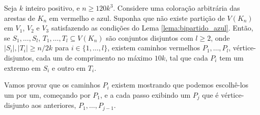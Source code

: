 \begin{fato}
	\label{fato:caminhos_vermelhos}
	Seja $k$ inteiro positivo, e $n\geq 120k^3$. Considere uma coloração arbitrária das arestas de $K_n$ em vermelho e azul. Suponha que não existe partição de $V(K_n)$ em $V_1$, $V_2$ e $V_3$ satisfazendo as condições do Lema \ref{lema:bipartido_azul}. Então, se $S_1, \dots, S_l$, $T_1, \dots, T_l\subseteq V(K_n)$ são conjuntos disjuntos com $l\geq2$, onde $|S_i|, |T_i|\geq n/2k$ para $i\in \{1, \dots, l\}$, existem caminhos vermelhos $P_1, \dots, P_l$, vértice-disjuntos, cada um de comprimento no máximo $10k$, tal que cada $P_i$ tem um extremo em $S_i$ e outro em $T_i$.
\end{fato}

\begin{dem}
	Vamos provar que os caminhos $P_i$ existem mostrando que podemos escolhê-los um por um, começando por $P_1$, e a cada passo exibindo um $P_j$ que é vértice-disjunto aos anteriores, $P_1, \dots, P_{j-1}$.
	

\end{dem}
